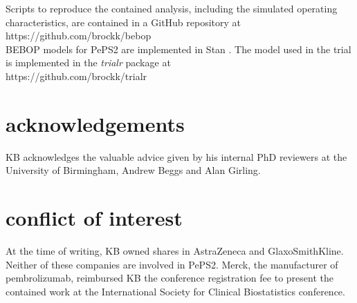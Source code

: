 \documentclass[alpha-refs]{wiley-article}
\begin{document}
\vspace{1cm}
Scripts to reproduce the contained analysis, including the simulated operating characteristics, are contained in a GitHub repository at\\ https://github.com/brockk/bebop
\\
BEBOP models for PePS2 are implemented in Stan \citep{Carpenter2016}.
The model used in the trial is implemented in the \textit{trialr} package at\\
https://github.com/brockk/trialr

\newpage

\section*{acknowledgements}
KB acknowledges the valuable advice given by his internal PhD reviewers at the University of Birmingham, Andrew Beggs and Alan Girling.

\section*{conflict of interest}
At the time of writing, KB owned shares in AstraZeneca and GlaxoSmithKline.
Neither of these companies are involved in PePS2.
Merck, the manufacturer of pembrolizumab, reimbursed KB the conference registration fee to present the contained work at the International Society for Clinical Biostatistics conference.

\printendnotes


\end{document}
